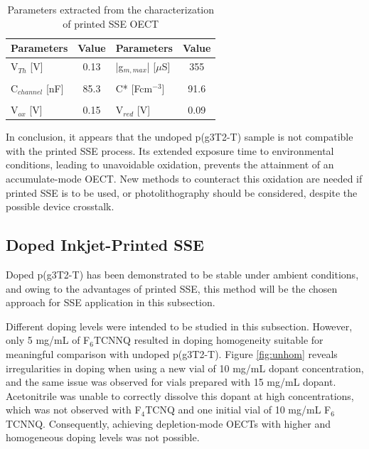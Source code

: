 \begin{table}[ht]
\centering
\caption{Parameters extracted from the characterization of printed SSE OECT}
\begin{tabular}{l|c||l|c}
Parameters & Value & Parameters & Value \\\hline \hline
V$_{Th}$ [V] &  0.13 & |g$_{m,max}$| [$\mu$S] & 355 \\
& & &\\[-1em]
C$_{channel}$ [nF] & 85.3 & C* [Fcm$^{-3}$] & 91.6 \\
& & &\\[-1em]
V$_{ox}$ [V] & 0.15 & V$_{red}$ [V] & 0.09 \\\hline
\hline
\end{tabular}
\label{tab:printedfom}
\end{table}

In conclusion, it appears that the undoped p(g3T2-T) sample is not compatible with the printed SSE process. Its extended exposure time to environmental conditions, leading to unavoidable oxidation, prevents the attainment of an accumulate-mode OECT. New methods to counteract this oxidation are needed if printed SSE is to be used, or photolithography should be considered, despite the possible device crosstalk.

\subsection{Doped Inkjet-Printed SSE} \label{subsec:dopedOECTs}
Doped p(g3T2-T) has been demonstrated to be stable under ambient conditions, and owing to the advantages of printed SSE, this method will be the chosen approach for SSE application in this subsection. 

Different doping levels were intended to be studied in this subsection. However, only 5 mg/mL of F$_{6}$TCNNQ resulted in doping homogeneity suitable for meaningful comparison with undoped p(g3T2-T). Figure \ref{fig:unhom} reveals irregularities in doping when using a new vial of 10 mg/mL dopant concentration, and the same issue was observed for vials prepared with 15 mg/mL dopant. Acetonitrile was unable to correctly dissolve this dopant at high concentrations, which was not observed with F$_{4}$TCNQ and one initial vial of 10 mg/mL F$_{6}$TCNNQ. Consequently, achieving depletion-mode OECTs with higher and homogeneous doping levels was not possible.

